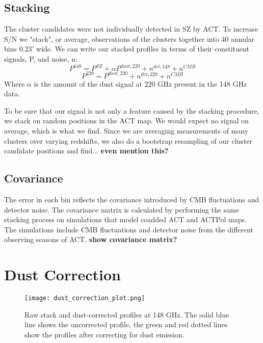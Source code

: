 \documentclass[twocolumn,iop]{emulateapj}
\begin{document}
\subsection{Stacking}
The cluster candidates were not individually detected in SZ by ACT. To increase S/N we "stack", or average, observations of the clusters together into 40 annular bins 0.23’ wide.
We can write our stacked profiles in terms of their constituent signals, P, and noise, n:
\begin{equation}
\label{eq:prof148}
P^{148} = P^{SZ} + \alpha P^{dust,220} + n^{det,148} + n^{CMB}
\end{equation}
\begin{equation}
\label{eq:prof220}
P^{220} = P^{dust,220} + n^{det,220} + n^{CMB}
\end{equation}
Where $\alpha$ is the amount of the dust signal at 220 GHz present in the 148 GHz data.

To be sure that our signal is not only a feature caused by the stacking procedure, we stack on random positions in the ACT map. We would expect no signal on average, which is what we find.
Since we are averaging measurements of many clusters over varying redshifts, we also do a bootstrap resampling of our cluster candidate positions and find... \textbf{even mention this?} 

\subsection{Covariance}
The error in each bin reflects the covariance introduced by CMB fluctuations and detector noise. The covariance matrix is calculated by performing the same stacking process on simulations that model coadded ACT and ACTPol maps. The simulations include CMB fluctuations and detector noise from the different observing seasons of ACT. 
\textbf{show covariance matrix?}

\section{Dust Correction}

\begin{figure}[H]
\centering
\texttt{[image: dust\_correction\_plot.png]}
\caption{Raw stack and dust-corrected profiles at 148 GHz. The solid blue line shows the uncorrected profile, the green and red dotted lines show the profiles after correcting for dust emission.}
\end{figure}
\end{document}
